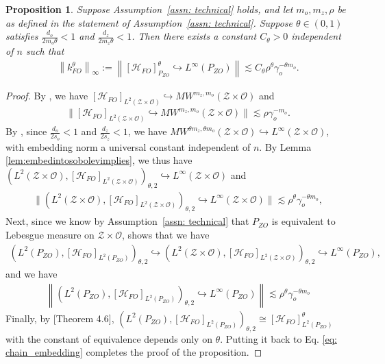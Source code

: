 \documentclass[11pt]{article}
\newcommand{\calZ}{\mathcal{Z}}
\newcommand{\calH}{\mathcal{H}}
\newcommand{\calO}{\mathcal{O}}
\newcommand{\0}{\mathbf{0}}
\newtheorem{prop}{Proposition}[section]
\begin{document}
\begin{appendix}
\begin{prop}
\label{prop:emb_main}
Suppose Assumption~\ref{assn: technical} holds, and let $m_o,m_z,\rho$ be as defined in the statement of Assumption~\ref{assn: technical}. Suppose $\theta\in (0,1)$ satisfies  $\frac{d_o}{2m_o\theta} < 1$ and $\frac{d_z}{2m_z\theta} < 1$. Then there exists a constant $C_{\theta}>0$ independent of $n$ such that 
\begin{align*}
    \left\|k_{FO}^{\theta}\right\|_{\infty} 
    := \left\|[\calH_{FO}]^{\theta}_{P_{ZO}}\hookrightarrow L^{\infty}(P_{ZO})\right\|\lesssim  C_{\theta} \rho^{\theta}\gamma_o^{-\theta m_o}.
\end{align*}
\end{prop}
\begin{proof}
By , we have $[\calH_{FO}]_{L^2(\calZ\times \calO)} \hookrightarrow MW^{m_z,m_o}(\calZ\times \calO)$ and
\begin{align*}
    \| [\calH_{FO}]_{L^2(\calZ\times \calO)} \hookrightarrow MW^{m_z,m_o}(\calZ\times \calO)\| \lesssim \rho  \gamma_o^{-m_o}.
\end{align*}
By , since $\frac{d_o}{2s_o}<1$ and $\frac{d_z}{2s_z}<1$, we have $MW^{\theta m_z, \theta m_o}(\calZ\times \calO)\hookrightarrow L^{\infty}(\calZ\times \calO)$, with embedding norm a universal constant independent of $n$.  By Lemma \ref{lem:embedintosobolevimplies}, we thus have $(L^2(\calZ\times \calO), [\calH_{FO}]_{L^2(\calZ\times \calO)})_{\theta,2}\hookrightarrow L^{\infty}(\calZ\times \calO)$ and 
\begin{align*}
    \| (L^2(\calZ\times \calO), [\calH_{FO}]_{L^2(\calZ\times\calO)})_{\theta,2}\hookrightarrow L^{\infty}(\calZ\times \calO)\| \lesssim \rho^{\theta}  \gamma_o^{-\theta m_o},
\end{align*}
Next, since we know by Assumption~\ref{assn: technical} that $P_{ZO}$ is equivalent to Lebesgue measure on $\calZ\times \calO$,  shows that we have 
\begin{align}
    \left(L^2(P_{ZO}), [\calH_{FO}]_{L^2(P_{ZO})}\right)_{\theta,2}\hookrightarrow \left(L^2(\calZ\times \calO), [\calH_{FO}]_{L^2(\calZ\times \calO)}\right)_{\theta,2} \hookrightarrow L^{\infty}(P_{ZO})\nonumber,
\end{align}
and we have
\begin{align}
\label{eq: chain_embedding}
    \left\|\left(L^2(P_{ZO}), [\calH_{FO}]_{L^2(P_{ZO})}\right)_{\theta,2}  \hookrightarrow L^{\infty}(P_{ZO})\right\| \lesssim \rho^{\theta}\gamma_o^{-\theta m_o}
\end{align}
Finally, by \cite{steinwart2012mercer}[Theorem 4.6], $(L^2(P_{ZO}), [\calH_{FO}]_{L^2(P_{ZO})})_{\theta,2} \cong [\calH_{FO}]^{\theta}_{L^2(P_{ZO})}$ with the constant of equivalence depends only on $\theta$. Putting it back to Eq. \eqref{eq: chain_embedding} completes the proof of the proposition.
\end{proof}


\end{appendix}
\end{document}
